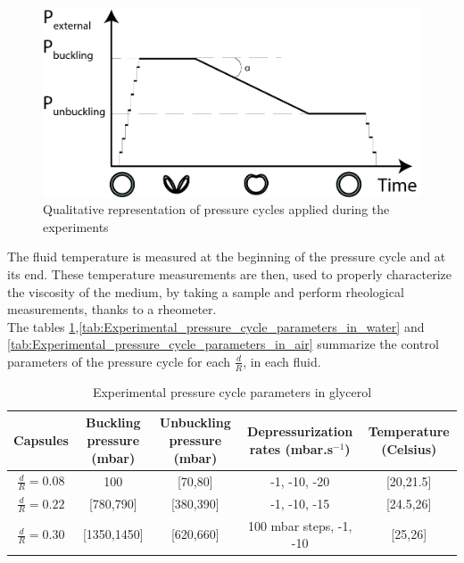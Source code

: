 \begin{figure}[H] %
	\centering%
  \includegraphics[width=\textwidth]{figures/Chapter_1/dynamic_pressure_cycle.png}
	\caption{Qualitative representation of pressure cycles applied during the experiments}
	\label{fig:dynamic_pressure_cycle}
\end{figure}
The fluid temperature is measured at the beginning of the pressure cycle and at its end. These temperature measurements are then, used to properly characterize the viscosity of the medium, by taking a sample and perform rheological measurements, thanks to a rheometer.\\
The tables \ref{tab:Experimental_pressure_cycle_parameters_in_glycerol},\ref{tab:Experimental_pressure_cycle_parameters_in_water} and \ref{tab:Experimental_pressure_cycle_parameters_in_air} summarize the control parameters of the pressure cycle for each $\frac{d}{R}$, in each fluid.
\begin{table}[H]
	\centering
		\begin{adjustbox}{width=\textwidth}
			\begin{tabular}{|c|c|c|c|c|}
				\hline
				Capsules & Buckling pressure (mbar) & Unbuckling pressure (mbar) & Depressurization rates (mbar.s$^{-1}$) & Temperature (Celsius) \\
				\hline
				$\frac{d}{R} = 0.08$ & 100 & [70,80] & -1, -10, -20 & [20,21.5]\\
				\hline
				$\frac{d}{R} = 0.22$ & [780,790] & [380,390] & -1, -10, -15 & [24.5,26]\\
				\hline
				$\frac{d}{R} = 0.30$ & [1350,1450] & [620,660] & 100 mbar steps, -1, -10 & [25,26]\\
				\hline
			\end{tabular}
		\end{adjustbox}
	
	\caption{Experimental pressure cycle parameters in glycerol}
	\label{tab:Experimental_pressure_cycle_parameters_in_glycerol}
\end{table}

